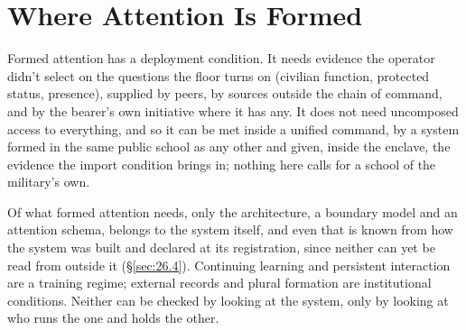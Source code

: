 \chapter{Where Attention Is Formed}
\label{sec:23}
Formed attention has a deployment condition. It needs evidence the operator didn't select on the questions the floor turns on (civilian function, protected status, presence), supplied by peers, by sources outside the chain of command, and by the bearer's own initiative where it has any. It does not need uncomposed access to everything, and so it can be met inside a unified command, by a system formed in the same public school as any other and given, inside the enclave, the evidence the import condition brings in; nothing here calls for a school of the military's own.

Of what formed attention needs, only the architecture, a boundary model and an attention schema, belongs to the system itself, and even that is known from how the system was built and declared at its registration, since neither can yet be read from outside it (\S\ref{sec:26.4}). Continuing learning and persistent interaction are a training regime; external records and plural formation are institutional conditions. Neither can be checked by looking at the system, only by looking at who runs the one and holds the other.

